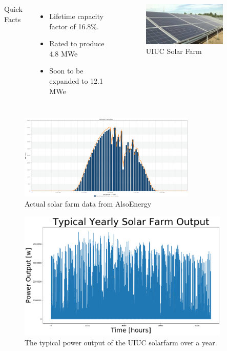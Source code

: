 \begin{frame}
	
\begin{columns}
	\column[t]{5cm}
	Quick Facts \cite{white_solar_2017}
	\begin{itemize}
		\item Lifetime capacity factor of 16.8\%. 
		\item Rated to produce 4.8 MWe
		\item Soon to be expanded to 12.1 MWe
	\end{itemize}
	\column[t]{5cm}
	\begin{figure}
		\centering
		\label{fig:solarfarm}
		\includegraphics[width=0.8\textwidth]{./images/solarfarm.jpeg}
		\caption*{UIUC Solar Farm}
	\end{figure}
\end{columns}
	\begin{figure}
		\centering
		\label{fig:solardata}
		\includegraphics[width=0.75\textwidth]{./images/actual_solarfarm_9-1-2016.png}
		\caption{Actual solar farm data from AlsoEnergy \cite{alsoenergy_university_2019}}
	\end{figure}
\end{frame}

\begin{frame}
	\begin{figure}
		\centering
		\label{fig:typical_solar}
		\includegraphics[width=0.9\textwidth]{./images/typical_solarpower.png}
		\caption{The typical power output of the UIUC solarfarm over a year.}
	\end{figure}
\end{frame}